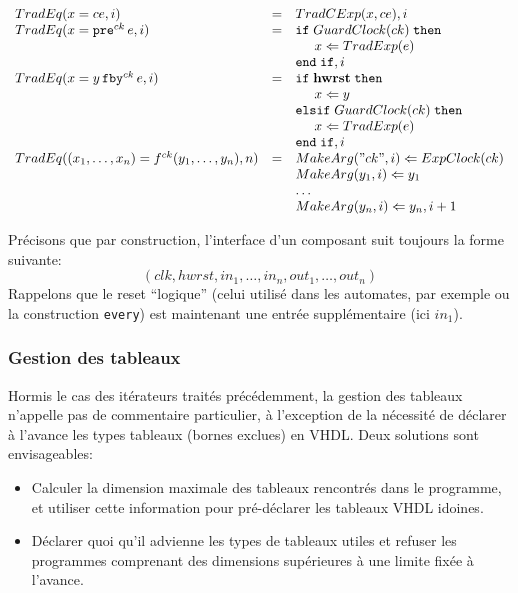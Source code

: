 \documentclass[a4paper]{article}
\newcommand{\mybox}[1]{\mbox{\tt{#1}}}
\newcommand{\ind}[0]{\hspace{0.5cm}}
\newcommand{\Fby}[2]{#1 \, \mybox{fby}^{ck} \, #2}
\newcommand{\Pre}[1]{\mybox{pre}^{ck} \, #1}
\newcommand{\App}[2]{#1^{ck}(#2)}
\newcommand{\Assign}[2]{#1 \Leftarrow #2}
\begin{document}
\[
\begin{array}{lcl}
  \TradEq{x = ce}{i} & = & \TradCE{x}{ce}, i \\

  \TradEq{x = \Pre{e}}{i} & = & \mathtt{if} \; \GEC{ck} \; \mathtt{then} \\
  & & \ind \Assign{x}{\TradE{e}} \\
  & & \mathtt{end} \; \mathtt{if}, i \\

  \TradEq{x = \Fby{y}{e}}{i} & = & \mathtt{if} \; \mathbf{hwrst}
  \; \mathtt{then} \\
  & & \ind \Assign{x}{y} \\
  & & \mathtt{elsif} \; \GEC{ck} \; \mathtt{then} \\
  & & \ind \Assign{x}{\TradE{e}} \\
  & & \mathtt{end} \; \mathtt{if}, i \\


  \TradEq{(x_1,\dots,x_n) = \App{f}{y_1,\dots,y_n}}{n} & = &
  \Assign{\MA{"ck"}{i}}{\EC{ck}} \\
  & & \Assign{\MA{y_1}{i}}{y_1} \\
  & & \dots \\
  & & \Assign{\MA{y_n}{i}}{y_n}, i + 1 \\
\end{array}
\]

Pr\'ecisons que par construction, l'interface d'un composant suit toujours la
forme suivante:
\[(clk, hwrst, in_1, \dots,in_n, out_1,\dots,out_n)
\]
Rappelons que le reset ``logique'' (celui utilis\'e dans les automates, par exemple
ou la construction \verb-every-) est maintenant une entr\'ee suppl\'ementaire (ici $in_1$).

\subsubsection{Gestion des tableaux}

Hormis le cas des it\'erateurs trait\'es pr\'ec\'edemment, la gestion des
tableaux n'appelle pas de commentaire particulier, \`a l'exception de la
n\'ecessit\'e de d\'eclarer \`a l'avance les types tableaux (bornes exclues) en
VHDL. Deux solutions sont envisageables:

\begin{itemize}
\item Calculer la dimension maximale des tableaux rencontr\'es dans le programme,
  et utiliser cette information pour pr\'e-d\'eclarer les tableaux VHDL idoines.
\item D\'eclarer quoi qu'il advienne les types de tableaux utiles et refuser les
  programmes comprenant des dimensions sup\'erieures \`a une limite fix\'ee \`a l'avance.
\end{itemize}
\end{document}
